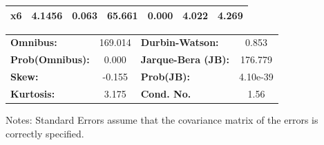 \begin{center}
\begin{tabular}{lcccccc}
\textbf{x6}    &       4.1456  &        0.063     &    65.661  &         0.000        &        4.022    &        4.269     \\
\bottomrule
\end{tabular}
\begin{tabular}{lclc}
\textbf{Omnibus:}       & 169.014 & \textbf{  Durbin-Watson:     } &    0.853  \\
\textbf{Prob(Omnibus):} &   0.000 & \textbf{  Jarque-Bera (JB):  } &  176.779  \\
\textbf{Skew:}          &  -0.155 & \textbf{  Prob(JB):          } & 4.10e-39  \\
\textbf{Kurtosis:}      &   3.175 & \textbf{  Cond. No.          } &     1.56  \\
\bottomrule
\end{tabular}
\end{center}

Notes: \newline
 [1] Standard Errors assume that the covariance matrix of the errors is correctly specified.